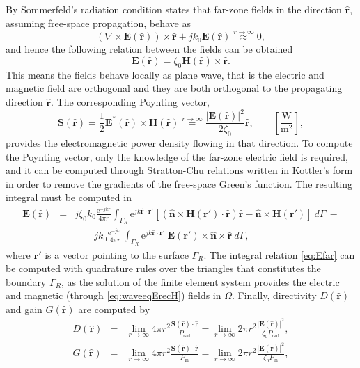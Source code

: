 By Sommerfeld's radiation condition states that far-zone fields in the direction $\hat{\mathbf{r}}$, assuming free-space propagation, behave as
$$(\nabla \times \mathbf{E}(\hat{\mathbf{r}})) \times \hat{\mathbf{r}} + j k_0 \mathbf{E}(\hat{\mathbf{r}}) \stackrel{ r \rightarrow \infty}{\approx} 0,$$
\noindent and hence the following relation between the fields can be obtained
$$ \mathbf{E}(\hat{\mathbf{r}}) = \zeta_0 \mathbf{H}(\hat{\mathbf{r}}) \times  \hat{\mathbf{r}}.$$
\noindent This means the fields behave locally as plane wave, that is the electric and magnetic field are orthogonal and they are both orthogonal to the propagating direction $\hat{\mathbf{r}}$. The corresponding Poynting vector,
$$ \mathbf{S}(\hat{\mathbf{r}}) = \frac{1}{2} \mathbf{E}^*(\hat{\mathbf{r}}) \times \mathbf{H}(\hat{\mathbf{r}}) \stackrel{ r \rightarrow \infty}{=} \frac{|\mathbf{E}(\hat{\mathbf{r}})|^2}{2 \zeta_0}\hat{\mathbf{r}}, \qquad \left[\frac{\mathrm{W}}{\mathrm{m}^2}\right],$$
\noindent provides the electromagnetic power density flowing in that direction. To compute the Poynting vector, only the knowledge of the far-zone electric field is required, and it can be computed through Stratton-Chu relations \cite{orfanidis2002electromagnetic} written in Kottler's form in order to remove the gradients of the free-space Green's function. The resulting integral must be computed in
\begin{eqnarray}
\label{eq:Efar}
{\mathbf{E}}(\hat{\mathbf{r}}) &=  &j\zeta_0k_0 \frac{\mathrm{e}^{-jkr}}{4\pi r} \int_{\Gamma_R}  \mathrm{e}^{jk \hat{\mathbf{r}} \cdot \mathbf{r}'} \left [ \left ( \hat{\mathbf{n}}\times\mathbf{H}(\mathbf{r}') \cdot \hat{\mathbf{r}} \right ) \hat{\mathbf{r}} - \hat{\mathbf{n}}\times\mathbf{H}(\mathbf{r}') \right ] \ d\Gamma \ - \nonumber \\ 
& & \qquad jk_0 \frac{\mathrm{e}^{-jkr}}{4\pi r} \int_{\Gamma_R} \mathrm{e}^{jk \hat{\mathbf{r}} \cdot \mathbf{r}'} \ \mathbf{E}(\mathbf{r}')\times\hat{\mathbf{n}}  \times \hat{\mathbf{r}}  \ d\Gamma,
\end{eqnarray}
\noindent where $\mathbf{r}'$ is a vector pointing to the surface $\Gamma_R$. The integral relation \eqref{eq:Efar} can be computed with quadrature rules over the triangles that constitutes the boundary $\Gamma_R$, as the solution of the finite element system provides the electric and magnetic (through \eqref{eq:waveeqErecH}) fields in $\Omega$.
%
\noindent Finally, directivity $D(\hat{\mathbf{r}})$ and gain $G(\hat{\mathbf{r}})$ are computed by
%
\begin{eqnarray}
\label{eq:Dir}
D(\hat{\mathbf{r}}) &= & \lim_{r\to\infty} 4 \pi r^2 \frac{\mathbf{S}(\hat{\mathbf{r}})\cdot \hat{\mathbf{r}}}{P_\mathrm{rad}} = \lim_{r\to\infty} 2 \pi r^2 \frac{|\mathbf{E}(\hat{\mathbf{r}})|^2}{\zeta_0 P_\mathrm{rad}},\\
\label{eq:Gain}
G(\hat{\mathbf{r}}) &= & \lim_{r\to\infty} 4 \pi r^2 \frac{\mathbf{S}(\hat{\mathbf{r}})\cdot \hat{\mathbf{r}}}{P_\mathrm{in}} = \lim_{r\to\infty} 2 \pi r^2 \frac{|\mathbf{E}(\hat{\mathbf{r}})|^2}{\zeta_0 P_\mathrm{in}}, 
\end{eqnarray}

